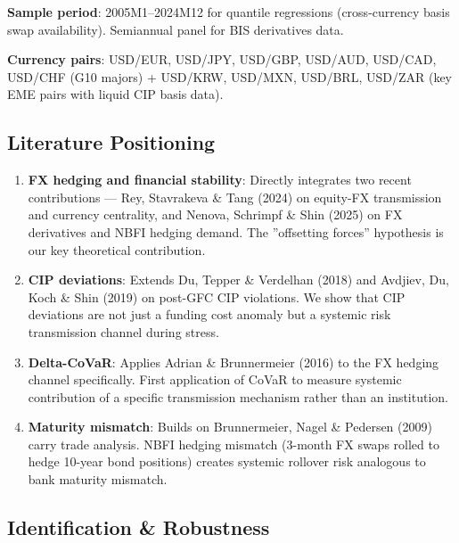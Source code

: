 \documentclass[11pt,a4paper]{article}
\begin{document}
\textbf{Sample period}: 2005M1--2024M12 for quantile regressions (cross-currency basis swap availability). Semiannual panel for BIS derivatives data.

\textbf{Currency pairs}: USD/EUR, USD/JPY, USD/GBP, USD/AUD, USD/CAD, USD/CHF (G10 majors) + USD/KRW, USD/MXN, USD/BRL, USD/ZAR (key EME pairs with liquid CIP basis data).


\subsection{Literature Positioning}

\begin{enumerate}
\item \textbf{FX hedging and financial stability}: Directly integrates two recent contributions --- Rey, Stavrakeva \& Tang (2024) on equity-FX transmission and currency centrality, and Nenova, Schrimpf \& Shin (2025) on FX derivatives and NBFI hedging demand. The ''offsetting forces'' hypothesis is our key theoretical contribution.

\item \textbf{CIP deviations}: Extends Du, Tepper \& Verdelhan (2018) and Avdjiev, Du, Koch \& Shin (2019) on post-GFC CIP violations. We show that CIP deviations are not just a funding cost anomaly but a systemic risk transmission channel during stress.

\item \textbf{Delta-CoVaR}: Applies Adrian \& Brunnermeier (2016) to the FX hedging channel specifically. First application of CoVaR to measure systemic contribution of a specific transmission mechanism rather than an institution.

\item \textbf{Maturity mismatch}: Builds on Brunnermeier, Nagel \& Pedersen (2009) carry trade analysis. NBFI hedging mismatch (3-month FX swaps rolled to hedge 10-year bond positions) creates systemic rollover risk analogous to bank maturity mismatch.

\end{enumerate}

\subsection{Identification \& Robustness}
\end{document}
